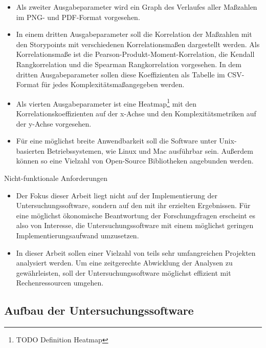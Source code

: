 \begin{itemize}
\item
    Als zweiter Ausgabeparameter wird ein Graph des Verlaufes aller
    Ma\ss zahlen im \ac{PNG}- und \ac{PDF}-Format vorgesehen.
\item
    In einem dritten Ausgabeparameter soll die Korrelation der Ma\ss zahlen
    mit den Storypoints mit verschiedenen Korrelationsma\ss en dargestellt
    werden. Als Korrelationsma\ss e ist die
    Pearson-Produkt-Moment-Korrelation, die Kendall Rangkorrelation und
    die Spearman Rangkorrelation vorgesehen. In dem dritten
    Ausgabeparameter sollen diese Koeffizienten als Tabelle im \ac{CSV}-Format
    für jedes Komplexitätsma\ss  angegeben werden.
\item
    Als vierten Ausgabeparameter ist eine Heatmap\footnote{TODO Definition
    Heatmap} mit den Korrelationskoeffizienten auf der x-Achse und den
    Komplexitätsmetriken auf der y-Achse vorgesehen.
\end{itemize}

\begin{itemize}
\item
    Für eine möglichst breite Anwendbarkeit soll die Software unter
    Unix-basierten Betriebssystemen, wie Linux und Mac ausführbar sein.
    Au\ss erdem können so eine Vielzahl von Open-Source Bibliotheken
    angebunden werden.
\end{itemize}

Nicht-funktionale Anforderungen

\begin{itemize}
\item
    Der Fokus dieser Arbeit liegt nicht auf der Implementierung der
    Untersuchungssoftware, sondern auf den mit ihr erzielten Ergebnissen.
    Für eine möglichst ökonomische Beantwortung der Forschungsfragen
    erscheint es also von Interesse, die Untersuchungssoftware mit einem
    möglichst geringen Implementierungsaufwand umzusetzen.
\item
    In dieser Arbeit sollen einer Vielzahl von teils sehr umfangreichen
    Projekten analysiert werden. Um eine zeitgerechte Abwicklung der
    Analysen zu gewährleisten, soll der Untersuchungssoftware möglichst
    effizient mit Rechenressourcen umgehen.
\end{itemize}

\subsection{Aufbau der Untersuchungssoftware}\label{Aufbau-der-Untersuchungssoftware}

